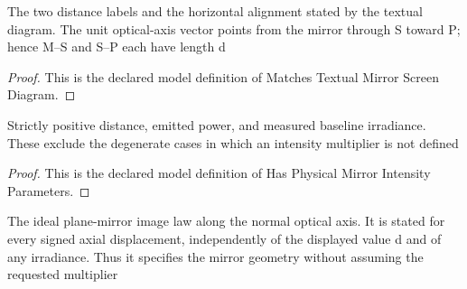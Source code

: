 \begin{definition}
  \label{def:physics:phyx-mini-0163:phyxminiproblems-problemphyxmini0163-matchestextualmirrorscreendiagram}
  The two distance labels and the horizontal alignment stated by the textual diagram. The unit optical-axis vector points from the mirror through S toward P; hence M--S and S--P each have length d
\end{definition}
\begin{proof}
  This is the declared model definition of Matches Textual Mirror Screen Diagram.
\end{proof}
\begin{definition}
  \label{def:physics:phyx-mini-0163:phyxminiproblems-problemphyxmini0163-hasphysicalmirrorintensityparameters}
  Strictly positive distance, emitted power, and measured baseline irradiance. These exclude the degenerate cases in which an intensity multiplier is not defined
\end{definition}
\begin{proof}
  This is the declared model definition of Has Physical Mirror Intensity Parameters.
\end{proof}
\begin{definition}
  \label{def:physics:phyx-mini-0163:phyxminiproblems-problemphyxmini0163-satisfiesidealplanemirrorgeometry}
  The ideal plane-mirror image law along the normal optical axis. It is stated for every signed axial displacement, independently of the displayed value d and of any irradiance. Thus it specifies the mirror geometry without assuming the requested multiplier
\end{definition}
